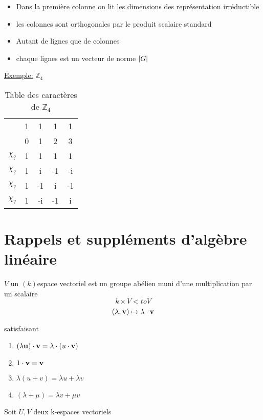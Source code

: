 \begin{tcolorbox}[title=Remarques]
	\begin{itemize}
		\item Dans la première colonne on lit les dimensions des représentation irréductible  
		\item les colonnes sont orthogonales par le produit scalaire standard 
		\item Autant de lignes que de colonnes
		\item chaque lignes est un vecteur de norme $\abs{G} $
	\end{itemize}
\end{tcolorbox}

\underline{Exemple:} $\mathds{Z}_{4}$ 

\begin{table}[htpb]
	\centering
	\label{tab:label}

	\begin{tabular}{c|c|c|c|c}
	& 1 & 1 & 1 &1 \\ 
	& 0 & 1 & 2 & 3\\ \hline
		$\chi_?$ &1 &1&1&1 \\\hline
		$\chi_?$ & 1 & i & -1 & -i \\\hline
		$\chi_?$ & 1 & -1 & i & -1 \\\hline
		$\chi_?$ & 1 & -i & -1 & i
	\end{tabular}
	\caption{Table des caractères de $\mathds{Z}_{4}$}
\end{table}

\section*{Rappels et suppléments d'algèbre linéaire}

$V$ un $(k)$espace vectoriel est un groupe abélien muni d'une multiplication par un scalaire
\[ k \times V <to V \]
\[ (\lambda, \vb{v}) \mapsto \lambda \cdot \vb{v} \]

satisfaisant 
\begin{enumerate}
	\item $(\lambda \vb{u}) \cdot \vb{v} = \lambda \cdot (u \cdot \vb{v})$
	\item $1 \cdot \vb{v} = \vb{v}$
	\item $\lambda(u +v) = \lambda u + \lambda v$
	\item $(\lambda + \mu ) = \lambda v + \mu v$
\end{enumerate}


Soit $U,V$ deux k-espaces vectoriels 

